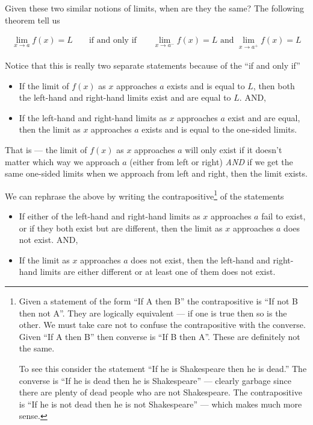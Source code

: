 Given these two similar notions of limits, when are they the same? The
following theorem tell us
\begin{theorem}
\begin{align*}
  \lim_{x \to a} f(x) = L && \mbox{ if and only if }
  && \lim_{x \to a^-} f(x) = L  \mbox{ and }
  \lim_{x \to a^+} f(x) = L
\end{align*}
\end{theorem}
Notice that this is really two separate statements because of the ``if and only
if''
\begin{itemize}
 \item If the limit of $f(x)$ as $x$ approaches $a$ exists and is equal to $L$,
then both the left-hand and right-hand limits exist and are equal to $L$. AND,
 \item If the left-hand and right-hand limits as $x$ approaches $a$ exist and
are equal, then the limit as $x$ approaches $a$ exists and is equal to the
one-sided limits.
\end{itemize}
That is --- the limit of $f(x)$ as $x$ approaches $a$ will only exist if it
doesn't matter which way we approach $a$ (either from left or right)
\emph{AND}
if we get the same one-sided limits when we approach from left and right, then
the limit exists.



We can rephrase the above by writing the contrapositive\footnote{\label{footnote contrapositive}Given a
statement of the form ``If A then B'' the contrapositive is ``If not B then
not A''. They are logically equivalent --- if one is true then so is the
other. We must take care not to confuse the contrapositive with the converse.
Given ``If A then B'' then converse is ``If B then A''. These are definitely not
the same.

To see this consider the statement ``If he is Shakespeare then he is dead.''
The converse is ``If he is dead then he is Shakespeare'' --- clearly garbage
since there are plenty of dead people who are not Shakespeare. The
contrapositive is ``If he is not dead then he is not Shakespeare'' --- which
makes much more sense.} of the statements
\begin{itemize}
\item If either of the left-hand and right-hand limits as $x$ approaches $a$
fail to exist, or if they both exist but are different, then the limit as $x$
approaches $a$ does not exist. AND,
 \item If the limit as $x$ approaches $a$ does not exist, then the left-hand
and right-hand limits are either different or at least one of them does not
exist.
\end{itemize}

